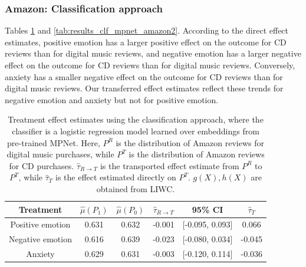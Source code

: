 \documentclass{article}
\begin{document}
\subsubsection{Amazon: Classification approach}

Tables \ref{tab:results_clf_mpnet_amazon1} and \ref{tab:results_clf_mpnet_amazon2}. According to the direct effect estimates, positive emotion has a larger positive effect on the outcome for CD reviews than for digital music reviews, and negative emotion has a larger negative effect on the outcome for CD reviews than for digital music reviews. Conversely, anxiety has a smaller negative effect on the outcome for CD reviews than for digital music reviews. Our transferred effect estimates reflect these trends for negative emotion and anxiety but not for positive emotion.

\begin{table}[!ht]
    \centering
    \begin{tabular}{c|ccccc}
    \toprule
    Treatment & $\hat{\mu}(P_1)$ & $\hat{\mu}(P_0)$ & $\hat{\tau}_{R \rightarrow T}$ & 95\% CI & $\hat{\tau}_T$ \\
    \midrule
    Positive emotion & 0.631 & 0.632 & -0.001 & [-0.095, 0.093] &      0.066 \\
    Negative emotion & 0.616 & 0.639 & -0.023 & [-0.080, 0.034] &     -0.045 \\
    Anxiety    & 0.629 & 0.631 & -0.003 & [-0.120, 0.114] &     -0.036 \\
    \bottomrule
    \end{tabular}
    \caption{Treatment effect estimates using the classification approach, where the classifier is a logistic regression model learned over embeddings from pre-trained MPNet. Here, $P^R$ is the distribution of Amazon reviews for digital music purchases, while $P^T$ is the distribution of Amazon reviews for CD purchases. $\hat{\tau}_{R \rightarrow T}$ is the transported effect estimate from $P^R$ to $P^T$, while $\hat{\tau}_T$ is the effect estimated directly on $P^T$. $g(X), h(X)$ are obtained from LIWC.}
    \label{tab:results_clf_mpnet_amazon1}
\end{table}
\end{document}
